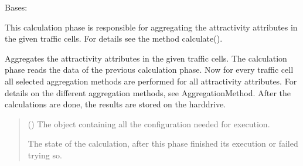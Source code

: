 \documentclass[letterpaper,10pt,english]{sphinxmanual}
\begin{document}
\begin{fulllineitems}
\label{\detokenize{apidoc/src.osm_configurator.model.project.calculation:src.osm_configurator.model.project.calculation.aggregation_phase.AggregationPhase}}
\pysigstartsignatures
{}
\pysigstopsignatures
\sphinxAtStartPar
Bases: {\hyperref[\detokenize{apidoc/src.osm_configurator.model.project.calculation:src.osm_configurator.model.project.calculation.calculation_phase_interface.ICalculationPhase}]{}}

\sphinxAtStartPar
This calculation phase is responsible for aggregating the attractivity attributes in the given traffic cells.
For details see the method calculate().

\begin{fulllineitems}
\label{\detokenize{apidoc/src.osm_configurator.model.project.calculation:src.osm_configurator.model.project.calculation.aggregation_phase.AggregationPhase.calculate}}
\pysigstartsignatures
{}
\pysigstopsignatures
\sphinxAtStartPar
Aggregates the attractivity attributes in the given traffic cells.
The calculation phase reads the data of the previous calculation phase. Now for every traffic cell all selected
aggregation methods are performed for all attractivity attributes. For details on the different aggregation
methods, see AggregationMethod.
After the calculations are done, the results are stored on the hard\sphinxhyphen{}drive.
\begin{quote}\begin{description}
\sphinxAtStartPar
{} ({\hyperref[\detokenize{apidoc/src.osm_configurator.model.project.configuration:src.osm_configurator.model.project.configuration.configuration_manager.ConfigurationManager}]{}}) \textendash{} The object containing all the configuration needed for execution.

\sphinxAtStartPar
The state of the calculation, after this phase finished its execution or failed trying so.

\sphinxAtStartPar
{\hyperref[\detokenize{apidoc/src.osm_configurator.model.project.calculation:src.osm_configurator.model.project.calculation.calculation_state_enum.CalculationState}]{}}

\end{description}\end{quote}

\end{fulllineitems}


\end{fulllineitems}
\end{document}
